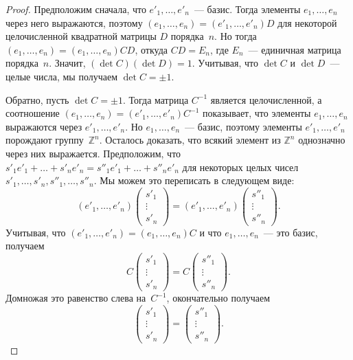 \documentclass[a4paper, 12pt]{article}
\def\ZZ{{\mathbb Z}}%
\theoremstyle{definition}
\theoremstyle{remark}
\begin{document}
\begin{proof}
Предположим сначала, что $e'_1, \ldots, e'_n$~--- базис. Тогда
элементы $e_1, \ldots, e_n$ через него выражаются, поэтому $(e_1,
\ldots, e_n) = (e'_1, \ldots, e'_n) D$ для некоторой целочисленной
квадратной матрицы $D$ порядка~$n$. Но тогда $(e_1, \ldots, e_n) =
(e_1, \ldots, e_n)CD$, откуда $CD = E_n$, где $E_n$~--- единичная
матрица порядка~$n$. Значит, $(\det C)(\det D) = 1$. Учитывая, что
$\det C$ и $\det D$~--- целые числа, мы получаем $\det C = \pm 1$.

Обратно, пусть $\det C = \pm 1$. Тогда матрица $C^{-1}$ является
целочисленной, а соотношение $(e_1, \ldots, e_n) = (e'_1, \ldots,
e'_n)C^{-1}$ показывает, что элементы $e_1, \ldots, e_n$ выражаются
через $e'_1, \ldots, e'_n$. Но $e_1, \ldots, e_n$~--- базис, поэтому
элементы $e'_1, \ldots, e'_n$ порождают группу~$\ZZ^n$. Осталось
доказать, что всякий элемент из $\ZZ^n$ однозначно через них
выражается. Предположим, что $s'_1e'_1 + \ldots + s'_ne'_n =
s''_1e'_1 + \ldots + s''_n e'_n$ для некоторых целых чисел $s'_1,
\ldots, s'_n, s''_1, \ldots, s''_n$. Мы можем это переписать в
следующем виде:
$$
(e'_1, \ldots, e'_n)
\begin{pmatrix} s'_1 \\ \vdots \\ s'_n \end{pmatrix} =
(e'_1, \ldots, e'_n)
\begin{pmatrix} s''_1 \\ \vdots \\ s''_n \end{pmatrix}.
$$
Учитывая, что $(e'_1, \ldots, e'_n) = (e_1, \ldots, e_n)C$ и что
$e_1, \ldots, e_n$~--- это базис, получаем
$$
C \begin{pmatrix} s'_1 \\ \vdots \\ s'_n \end{pmatrix} = C
\begin{pmatrix} s''_1 \\ \vdots \\ s''_n \end{pmatrix}.
$$
Домножая это равенство слева на~$C^{-1}$, окончательно получаем
$$
\begin{pmatrix} s'_1 \\ \vdots \\ s'_n \end{pmatrix} =
\begin{pmatrix} s''_1 \\ \vdots \\ s''_n \end{pmatrix}.
$$
\end{proof}
\end{document}

